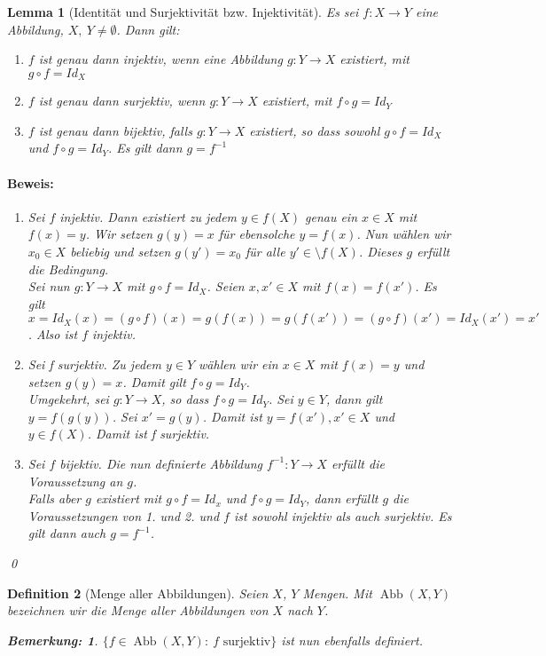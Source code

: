\documentclass{report}
\newcommand{\IN}[1]{\index{#1|BH}}
\DeclareMathOperator{\abb}{Abb}
\theoremstyle{customrem}
\newtheorem*{bemerkung}{Bemerkung\textnormal:}
\theoremstyle{customdef}
\newtheorem{definition}{Definition}[chapter]
\newtheorem{lemma}[definition]{Lemma}
\renewenvironment{proof}{\paragraph{Beweis: }}{\qed}
\begin{document}
	\begin{lemma}[Identität und Surjektivität bzw. Injektivität]
		Es sei \(f : X \to Y\) eine Abbildung, \(X,\ Y \neq \emptyset\). Dann gilt:
		\begin{enumerate}
			\itemsep0cm
			\item \(f\) ist genau dann injektiv, wenn eine Abbildung \(g : Y \to X\) existiert, mit \(g \circ f = Id_X\)
			\item \(f\) ist genau dann surjektiv, wenn \(g : Y \to X\) existiert, mit \(f \circ g = Id_Y\)
			\item \(f\) ist genau dann bijektiv, falls \(g : Y \to X\) existiert, so dass sowohl \(g \circ f = Id_X\) und \(f \circ g = Id_Y\). Es gilt dann \(g = f^{-1}\)
		\end{enumerate}
		\begin{proof}
			\begin{enumerate}
				\item Sei \(f\) injektiv. Dann existiert zu jedem \(y \in f(X)\) genau ein \(x \in X\) mit \(f(x) = y\). Wir setzen \(g(y) = x\) für ebensolche \(y = f(x)\). Nun wählen wir \(x_0\in X\) beliebig und setzen \(g(y') = x_0\) für alle \(y' \in \setminus f(X)\). Dieses \(g\) erfüllt die Bedingung.\\
				Sei nun \(g : Y \to X\) mit \(g \circ f = Id_X\). Seien \(x, x' \in X\) mit \(f(x) = f(x')\). Es gilt \(x = Id_X(x) = (g \circ f)(x) = g(f(x)) = g(f(x')) = (g \circ f)(x') = Id_X(x') = x'\). Also ist \(f\) injektiv.
				\item Sei f surjektiv. Zu jedem \(y \in Y\) wählen wir ein \(x \in X\) mit \(f(x) = y\) und setzen \(g(y) = x\). Damit gilt \(f \circ g = Id_Y\).\\
				Umgekehrt, sei \(g : Y \to X\), so dass \(f \circ g = Id_Y\). Sei \(y \in Y\), dann gilt \(y = f(g(y))\). Sei \(x' = g(y)\). Damit ist \(y = f(x'), x' \in X\) und \(y \in f(X)\). Damit ist f surjektiv.
				\item Sei \(f\) bijektiv. Die nun definierte Abbildung \(f^{-1} : Y \to X\) erfüllt die Voraussetzung an \(g\).\\
				Falls aber \(g\) existiert mit \(g \circ f = Id_x\) und \(f \circ g = Id_Y\), dann erfüllt \(g\) die Voraussetzungen von 1. und 2. und \(f\) ist sowohl injektiv als auch surjektiv. Es gilt dann auch \(g = f^{-1}\).
			\end{enumerate}
		\end{proof}
	\end{lemma}
	
	\begin{definition}[Menge aller Abbildungen]
		\IN{Menge aller Abbildungen}
		Seien \(X\), \(Y\) Mengen. Mit \(\abb(X, Y)\) bezeichnen wir die Menge aller Abbildungen von \(X\) nach \(Y\).
		\begin{bemerkung}
			\(\{ f \in \abb(X, Y) :\ f \text{ surjektiv}\}\) ist nun ebenfalls definiert.
		\end{bemerkung}
	\end{definition}
	
\end{document}
